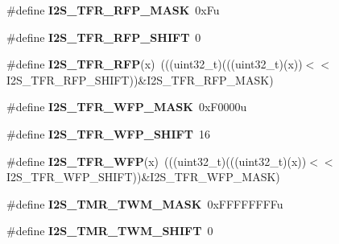 \begin{DoxyCompactItemize}
\item 
\#define {\bfseries I2\+S\+\_\+\+T\+F\+R\+\_\+\+R\+F\+P\+\_\+\+M\+A\+SK}~0x\+Fu\hypertarget{group__I2S__Register__Masks_ga7c4e30b6d86edce6e8767f7800ef88a4}{}\label{group__I2S__Register__Masks_ga7c4e30b6d86edce6e8767f7800ef88a4}

\item 
\#define {\bfseries I2\+S\+\_\+\+T\+F\+R\+\_\+\+R\+F\+P\+\_\+\+S\+H\+I\+FT}~0\hypertarget{group__I2S__Register__Masks_ga9eee8668c1cef6c911103d45234930b3}{}\label{group__I2S__Register__Masks_ga9eee8668c1cef6c911103d45234930b3}

\item 
\#define {\bfseries I2\+S\+\_\+\+T\+F\+R\+\_\+\+R\+FP}(x)~(((uint32\+\_\+t)(((uint32\+\_\+t)(x))$<$$<$I2\+S\+\_\+\+T\+F\+R\+\_\+\+R\+F\+P\+\_\+\+S\+H\+I\+FT))\&I2\+S\+\_\+\+T\+F\+R\+\_\+\+R\+F\+P\+\_\+\+M\+A\+SK)\hypertarget{group__I2S__Register__Masks_ga1d3bcbec6628bf077ca879fe9a98e43d}{}\label{group__I2S__Register__Masks_ga1d3bcbec6628bf077ca879fe9a98e43d}

\item 
\#define {\bfseries I2\+S\+\_\+\+T\+F\+R\+\_\+\+W\+F\+P\+\_\+\+M\+A\+SK}~0x\+F0000u\hypertarget{group__I2S__Register__Masks_gae62f96d35bbfdc150f3d3cc9a0a27077}{}\label{group__I2S__Register__Masks_gae62f96d35bbfdc150f3d3cc9a0a27077}

\item 
\#define {\bfseries I2\+S\+\_\+\+T\+F\+R\+\_\+\+W\+F\+P\+\_\+\+S\+H\+I\+FT}~16\hypertarget{group__I2S__Register__Masks_ga76c81603713aba769396b8c4921078c2}{}\label{group__I2S__Register__Masks_ga76c81603713aba769396b8c4921078c2}

\item 
\#define {\bfseries I2\+S\+\_\+\+T\+F\+R\+\_\+\+W\+FP}(x)~(((uint32\+\_\+t)(((uint32\+\_\+t)(x))$<$$<$I2\+S\+\_\+\+T\+F\+R\+\_\+\+W\+F\+P\+\_\+\+S\+H\+I\+FT))\&I2\+S\+\_\+\+T\+F\+R\+\_\+\+W\+F\+P\+\_\+\+M\+A\+SK)\hypertarget{group__I2S__Register__Masks_ga1b920f661b6f4cf70114b456f0e8304c}{}\label{group__I2S__Register__Masks_ga1b920f661b6f4cf70114b456f0e8304c}

\item 
\#define {\bfseries I2\+S\+\_\+\+T\+M\+R\+\_\+\+T\+W\+M\+\_\+\+M\+A\+SK}~0x\+F\+F\+F\+F\+F\+F\+F\+Fu\hypertarget{group__I2S__Register__Masks_ga0c694ab6fec26ca6fc159fe1d8ccb591}{}\label{group__I2S__Register__Masks_ga0c694ab6fec26ca6fc159fe1d8ccb591}

\item 
\#define {\bfseries I2\+S\+\_\+\+T\+M\+R\+\_\+\+T\+W\+M\+\_\+\+S\+H\+I\+FT}~0\hypertarget{group__I2S__Register__Masks_ga50ccb20fbe6c1de252bfe8ffba29fb3e}{}\label{group__I2S__Register__Masks_ga50ccb20fbe6c1de252bfe8ffba29fb3e}


\end{DoxyCompactItemize}
